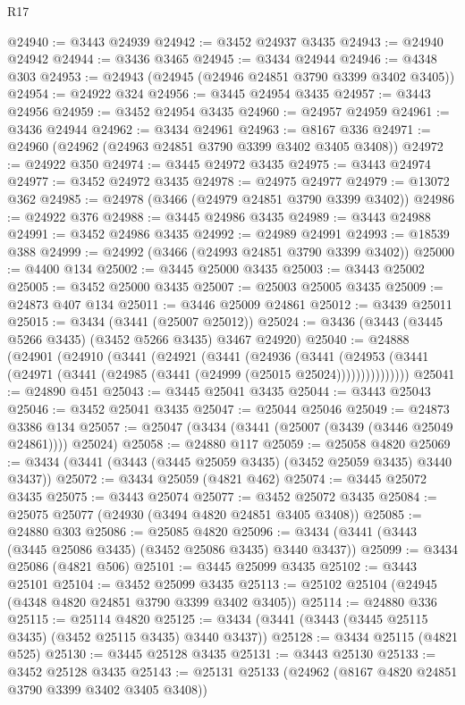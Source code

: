 \begin{lexlean}{R17}
\begin{coremodule}
@24940 := @3443 @24939
@24942 := @3452 @24937 @3435
@24943 := @24940 @24942
@24944 := @3436 @3465
@24945 := @3434 @24944
@24946 := @4348 @303
@24953 := @24943 (@24945 (@24946 @24851 @3790 @3399 @3402 @3405))
@24954 := @24922 @324
@24956 := @3445 @24954 @3435
@24957 := @3443 @24956
@24959 := @3452 @24954 @3435
@24960 := @24957 @24959
@24961 := @3436 @24944
@24962 := @3434 @24961
@24963 := @8167 @336
@24971 := @24960 (@24962 (@24963 @24851 @3790 @3399 @3402 @3405 @3408))
@24972 := @24922 @350
@24974 := @3445 @24972 @3435
@24975 := @3443 @24974
@24977 := @3452 @24972 @3435
@24978 := @24975 @24977
@24979 := @13072 @362
@24985 := @24978 (@3466 (@24979 @24851 @3790 @3399 @3402))
@24986 := @24922 @376
@24988 := @3445 @24986 @3435
@24989 := @3443 @24988
@24991 := @3452 @24986 @3435
@24992 := @24989 @24991
@24993 := @18539 @388
@24999 := @24992 (@3466 (@24993 @24851 @3790 @3399 @3402))
@25000 := @4400 @134
@25002 := @3445 @25000 @3435
@25003 := @3443 @25002
@25005 := @3452 @25000 @3435
@25007 := @25003 @25005 @3435
@25009 := @24873 @407 @134
@25011 := @3446 @25009 @24861
@25012 := @3439 @25011
@25015 := @3434 (@3441 (@25007 @25012))
@25024 := @3436 (@3443 (@3445 @5266 @3435) (@3452 @5266 @3435) @3467 @24920)
@25040 := @24888
    (@24901
      (@24910
        (@3441
          (@24921
            (@3441
              (@24936
                (@3441
                  (@24953 (@3441 (@24971 (@3441 (@24985 (@3441 (@24999 (@25015 @25024)))))))))))))))
@25041 := @24890 @451
@25043 := @3445 @25041 @3435
@25044 := @3443 @25043
@25046 := @3452 @25041 @3435
@25047 := @25044 @25046
@25049 := @24873 @3386 @134
@25057 := @25047 (@3434 (@3441 (@25007 (@3439 (@3446 @25049 @24861)))) @25024)
@25058 := @24880 @117
@25059 := @25058 @4820
@25069 := @3434 (@3441 (@3443 (@3445 @25059 @3435) (@3452 @25059 @3435) @3440 @3437))
@25072 := @3434 @25059 (@4821 @462)
@25074 := @3445 @25072 @3435
@25075 := @3443 @25074
@25077 := @3452 @25072 @3435
@25084 := @25075 @25077 (@24930 (@3494 @4820 @24851 @3405 @3408))
@25085 := @24880 @303
@25086 := @25085 @4820
@25096 := @3434 (@3441 (@3443 (@3445 @25086 @3435) (@3452 @25086 @3435) @3440 @3437))
@25099 := @3434 @25086 (@4821 @506)
@25101 := @3445 @25099 @3435
@25102 := @3443 @25101
@25104 := @3452 @25099 @3435
@25113 := @25102 @25104 (@24945 (@4348 @4820 @24851 @3790 @3399 @3402 @3405))
@25114 := @24880 @336
@25115 := @25114 @4820
@25125 := @3434 (@3441 (@3443 (@3445 @25115 @3435) (@3452 @25115 @3435) @3440 @3437))
@25128 := @3434 @25115 (@4821 @525)
@25130 := @3445 @25128 @3435
@25131 := @3443 @25130
@25133 := @3452 @25128 @3435
@25143 := @25131 @25133 (@24962 (@8167 @4820 @24851 @3790 @3399 @3402 @3405 @3408))

\end{coremodule}
\end{lexlean}
